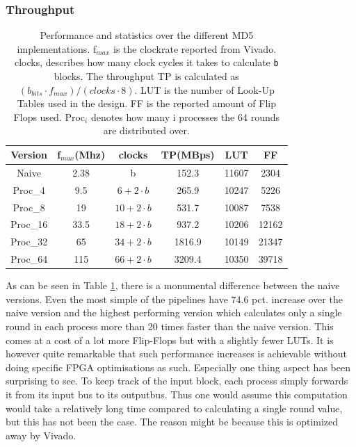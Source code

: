 \documentclass[a4paper]{article}
\begin{document}
\subsubsection{Throughput}
\label{sec:orga71786b}
\begin{table}[!htb]
\centering
\captionsetup{width=.8\linewidth}
\begin{tabular}{c c c c c c}
\hline
Version & f$_{max}$(Mhz) & clocks & TP(MBps) & LUT & FF\\
\hline
Naive & 2.38 & b & 152.3 & 11607 & 2304\\
Proc_{4} & 9.5 &   \( 6+2 \cdot b\) & 265.9 & 10247 & 5226\\
Proc_{8} & 19 &    \(10+2 \cdot b\) & 531.7 & 10087 & 7538\\
Proc_{16} & 33.5 & \(18+2 \cdot b\) & 937.2 & 10206 & 12162\\
Proc_{32} & 65 &   \(34+2 \cdot b\) & 1816.9 & 10149 & 21347\\
Proc_{64} & 115 &  \(66+2 \cdot b\) & 3209.4 & 10350 & 39718\\
\end{tabular}
\caption[MD5-versions]%
{Performance and statistics over the different MD5 implementations. f$_{max}$ is the clockrate reported from Vivado. clocks, describes how many clock cycles it takes to calculate \texttt{b} blocks. The throughput TP is calculated as \((b_{bits}\cdot f_{max})/(clocks \cdot 8)\). LUT is the number of Look-Up Tables used in the design. FF is the reported amount of Flip Flops used. Proc$_{i}$ denotes how many i processes the 64 rounds are distributed over.}
\label{tab:MD5versions}
\end{table}
As can be seen in Table \ref{tab:MD5versions}, there is a monumental difference between the naive versions. Even the most simple of the pipelines have 74.6 pct. increase over the naive version and the highest performing version which calculates only a single round in each process more than 20 times faster than the naive version. This comes at a cost of a lot more Flip-Flops but with a slightly fewer LUTs. It is however quite remarkable that such performance increases is achievable without doing specific FPGA optimisations as such. Especially one thing aspect has been surprising to see. To keep track of the input block, each process simply forwards it from its input bus to its outputbus. Thus one would assume this computation would take a relatively long time compared to calculating a single round value, but this has not been the case. The reason might be because this is optimized away by Vivado.
\end{document}
